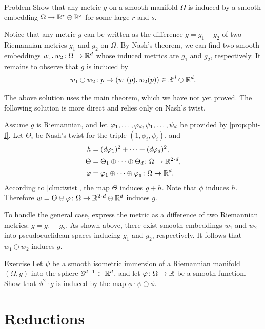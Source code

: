 \begin{thm}{Problem}
Show that any metric $g$ on a smooth manifold $\Omega$ is induced by a smooth embedding $\Omega\to \mathbb{R}^r\ominus\mathbb{R}^s$ for some large $r$ and $s$.
\end{thm}

Notice that any metric $g$ can be written as the difference $g = g_1 - g_2$ of two Riemannian metrics $g_1$ and $g_2$ on $\Omega$.
By Nash's theorem, we can find two smooth embeddings $w_1, w_2 \colon \Omega \to \mathbb{R}^d$ whose induced metrics are $g_1$ and $g_2$, respectively.
It remains to observe that $g$ is induced by
\[w_1\ominus w_2\colon p\mapsto(w_1(p),w_2(p))\in \mathbb{R}^d\ominus\mathbb{R}^d.\]
\qedsf

The above solution uses the main theorem, which we have not yet proved.
The following solution is more direct and relies only on Nash's twist.

Assume $g$ is Riemannian, and let $\phi_1,\z\dots,\phi_d,\psi_1,\z\dots,\psi_d$ be provided by \ref{prop:phi-f}.
Let $\Theta_i$ be Nash's twist for the triple $(1,\phi_i,\psi_i)$, and
\begin{align*}
h&=(d\phi_1)^2+\dots+(d\phi_d)^2,
\\
\Theta&=\Theta_1\oplus\dots\oplus \Theta_d\:\Omega\to \RR^{2\cdot d},
\\
\phi&=\phi_1\oplus \dots\oplus \phi_d\:\Omega\to \RR^{d}.
\end{align*}
According to \ref{clm:twist}, the map $\Theta$ induces $g+h$.
Note that $\phi$ induces $h$.
Therefore $w=\Theta\ominus \phi\:\Omega\to \RR^{2\cdot d}\ominus\RR^d$ induces $g$.

To handle the general case, express the metric as a difference of two Riemannian metrics: $g = g_1 - g_2$.
As shown above, there exist smooth embeddings $w_1$ and $w_2$ into pseudoeuclidean spaces inducing $g_1$ and $g_2$, respectively.
It follows that $w_1 \ominus w_2$ induces $g$.
\qeds

\begin{thm}{Exercise}\label{ex:f-ominus-phi}
Let $\psi$ be a smooth isometric immersion of a Riemannian manifold $(\Omega, g)$ into the sphere $\mathbb{S}^{d-1} \subset \mathbb{R}^d$, and let $\varphi \colon \Omega \to \mathbb{R}$ be a smooth function.
Show that $\phi^2 \cdot g$ is induced by the map $\phi \cdot \psi \ominus \phi$.
\end{thm}

\chapter{Reductions}

